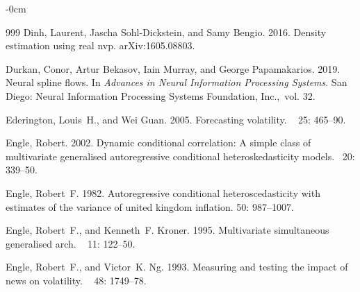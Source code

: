 \documentclass[risks,article,accept,pdftex,moreauthors]{Definitions/mdpi}
\begin{document}
\begin{adjustwidth}{-\extralength}{0cm}
\begin{thebibliography}{999}
Dinh, Laurent, Jascha Sohl-Dickstein, and Samy Bengio. 2016.
\newblock Density estimation using real nvp.
  arXiv:1605.08803.

Durkan, Conor, Artur Bekasov, Iain Murray, and George Papamakarios. 2019.
\newblock Neural spline flows.
\newblock In {\em Advances in Neural Information Processing Systems\/}. {San Diego: Neural Information Processing Systems Foundation, Inc.,}~{vol. 32}.

Ederington, Louis~H., and Wei Guan. 2005.
\newblock Forecasting volatility.
~{ 25\/}: 465--90.

Engle, Robert. 2002.
\newblock Dynamic conditional correlation: A simple class of multivariate
  generalised autoregressive conditional heteroskedasticity models.
~{20\/}: 
  339--50.

Engle, Robert~F. 1982.
\newblock Autoregressive conditional heteroscedasticity with estimates of the
  variance of united kingdom inflation.
 {50:} 987--1007.

Engle, Robert~F., and Kenneth~F. Kroner. 1995.
\newblock Multivariate simultaneous generalised arch.
~{ 11\/}: 122--50.

Engle, Robert~F., and Victor~K. Ng. 1993.
\newblock Measuring and testing the impact of news on volatility.
~{ 48\/}: 1749--78.


\end{thebibliography}
\end{adjustwidth}
\end{document}

